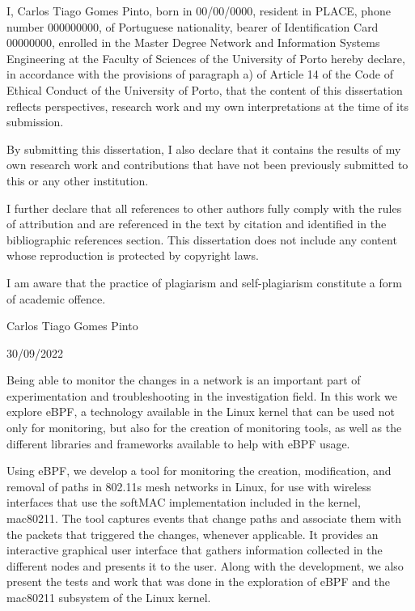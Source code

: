 
I, Carlos Tiago Gomes Pinto, born in 00/00/0000, resident in PLACE, phone number
000000000, of Portuguese nationality, bearer of Identification Card 00000000,
enrolled in the Master Degree Network and Information Systems Engineering at the
Faculty of Sciences of the University of Porto hereby declare, in accordance
with the provisions of paragraph a) of Article 14 of the Code of Ethical Conduct
of the University of Porto, that the content of this dissertation reflects
perspectives, research work and my own interpretations at the time of its
submission.

By submitting this dissertation, I also declare that it contains the results of
my own research work and contributions that have not been previously submitted
to this or any other institution.

I further declare that all references to other authors fully comply with the
rules of attribution and are referenced in the text by citation and identified
in the bibliographic references section. This dissertation does not include any
content whose reproduction is protected by copyright laws.

I am aware that the practice of plagiarism and self-plagiarism constitute a form
of academic offence.

Carlos Tiago Gomes Pinto

30/09/2022



Being able to monitor the changes in a network is an important part of
experimentation and troubleshooting in the investigation field. In this work we
explore eBPF, a technology available in the Linux kernel that can be used not
only for monitoring, but also for the creation of monitoring tools, as well as
the different libraries and frameworks available to help with eBPF usage.

Using eBPF, we develop a tool for monitoring the creation, modification, and
removal of paths in 802.11s mesh networks in Linux, for use with wireless
interfaces that use the softMAC implementation included in the kernel, mac80211.
The tool captures events that change paths and associate them with the packets
that triggered the changes, whenever applicable. It provides an interactive
graphical user interface that gathers information collected in the different
nodes and presents it to the user.
Along with the development, we also present the tests and work that was done in
the exploration of eBPF and the mac80211 subsystem of the Linux kernel.


